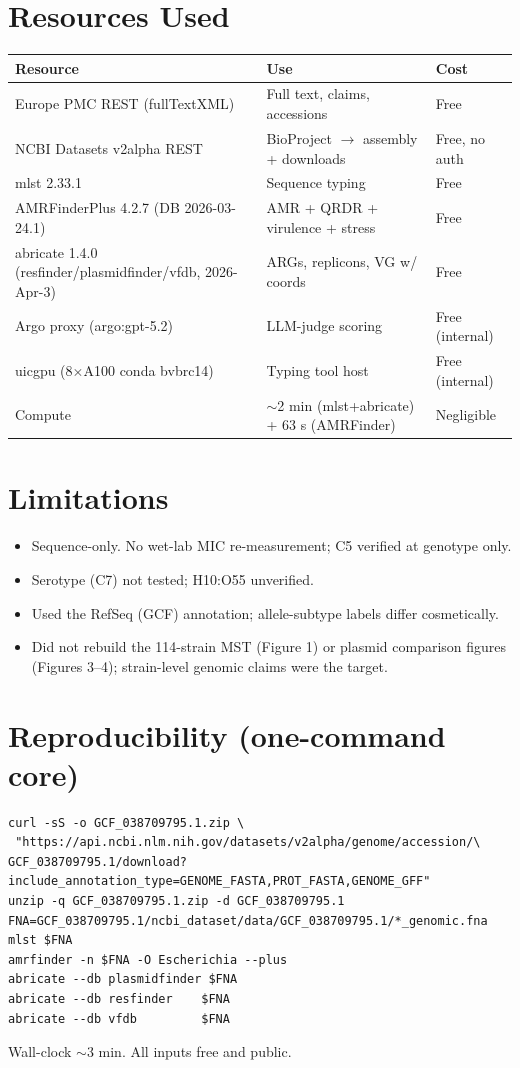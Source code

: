 \documentclass[11pt,letterpaper]{article}
\begin{document}
\section{Resources Used}
\begin{longtable}{@{}p{5cm}p{7cm}p{2.5cm}@{}}
\toprule
Resource & Use & Cost \\
\midrule
Europe PMC REST (fullTextXML) & Full text, claims, accessions & Free \\
NCBI Datasets v2alpha REST & BioProject $\rightarrow$ assembly + downloads & Free, no auth \\
mlst 2.33.1 & Sequence typing & Free \\
AMRFinderPlus 4.2.7 (DB 2026-03-24.1) & AMR + QRDR + virulence + stress & Free \\
abricate 1.4.0 (resfinder/plasmidfinder/vfdb, 2026-Apr-3) & ARGs, replicons, VG w/ coords & Free \\
Argo proxy (argo:gpt-5.2) & LLM-judge scoring & Free (internal) \\
uicgpu (8$\times$A100 conda bvbrc14) & Typing tool host & Free (internal) \\
Compute & $\sim$2 min (mlst+abricate) + 63 s (AMRFinder) & Negligible \\
\bottomrule
\end{longtable}

\section{Limitations}
\begin{itemize}[leftmargin=1.5em]
  \item Sequence-only. No wet-lab MIC re-measurement; C5 verified at genotype only.
  \item Serotype (C7) not tested; H10:O55 unverified.
  \item Used the RefSeq (GCF) annotation; allele-subtype labels differ cosmetically.
  \item Did not rebuild the 114-strain MST (Figure 1) or plasmid comparison
        figures (Figures 3--4); strain-level genomic claims were the target.
\end{itemize}

\section*{Reproducibility (one-command core)}
\begin{verbatim}
curl -sS -o GCF_038709795.1.zip \
 "https://api.ncbi.nlm.nih.gov/datasets/v2alpha/genome/accession/\
GCF_038709795.1/download?include_annotation_type=GENOME_FASTA,PROT_FASTA,GENOME_GFF"
unzip -q GCF_038709795.1.zip -d GCF_038709795.1
FNA=GCF_038709795.1/ncbi_dataset/data/GCF_038709795.1/*_genomic.fna
mlst $FNA
amrfinder -n $FNA -O Escherichia --plus
abricate --db plasmidfinder $FNA
abricate --db resfinder    $FNA
abricate --db vfdb         $FNA
\end{verbatim}
Wall-clock $\sim$3 min. All inputs free and public.
\end{document}
